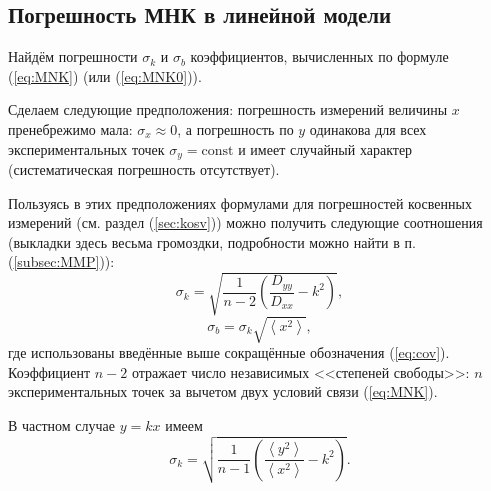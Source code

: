 \subsection{Погрешность МНК в линейной модели}

Найдём погрешности $\sigma_{k}$ и $\sigma_{b}$ коэффициентов, вычисленных
по формуле (\ref{eq:MNK}) (или (\ref{eq:MNK0})).

Сделаем следующие предположения: погрешность измерений величины $x$
пренебрежимо мала: $\sigma_{x}\approx0$, а погрешность по $y$ одинакова
для всех экспериментальных точек $\sigma_{y}=\mathrm{const}$ и имеет
случайный характер (систематическая погрешность отсутствует).

Пользуясь в этих предположениях формулами для погрешностей косвенных
измерений (см. раздел (\ref{sec:kosv})) можно получить следующие
соотношения (выкладки здесь весьма громоздки, подробности можно найти
в п. (\ref{subsec:MMP})):
\begin{equation}
\sigma_{k}=\sqrt{\frac{1}{n-2}\left(\frac{D_{yy}}{D_{xx}}-k^{2}\right)},\label{eq:MNK_sigma}
\end{equation}
\begin{equation}
\sigma_{b}=\sigma_{k}\sqrt{\left\langle x^{2}\right\rangle },\label{eq:MNK_sigma_b}
\end{equation}
где использованы введённые выше сокращённые обозначения (\ref{eq:cov}).
Коэффициент $n-2$ отражает число независимых <<степеней
свободы>>: $n$ экспериментальных точек за вычетом двух
условий связи (\ref{eq:MNK}).

В частном случае $y=kx$ имеем
\begin{equation}
\sigma_{k}=\sqrt{\frac{1}{n-1}\left(\frac{\left\langle y^{2}\right\rangle }{\left\langle x^{2}\right\rangle }-k^{2}\right)}.\label{eq:MNK_sigma0}
\end{equation}





